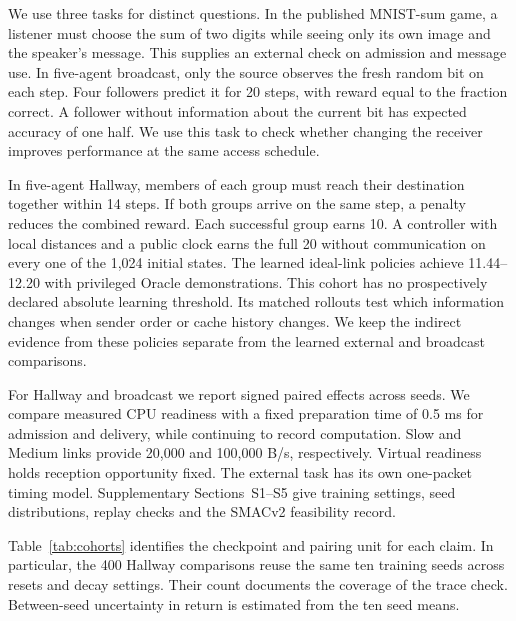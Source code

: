 \documentclass[a4paper,fleqn]{cas-dc}
\begin{document}
We use three tasks for distinct questions. In the published MNIST-sum game, a listener must choose the sum of two digits while seeing only its own image and the speaker's message. This supplies an external check on admission and message use. In five-agent broadcast, only the source observes the fresh random bit on each step. Four followers predict it for 20 steps, with reward equal to the fraction correct. A follower without information about the current bit has expected accuracy of one half. We use this task to check whether changing the receiver improves performance at the same access schedule.

In five-agent Hallway, members of each group must reach their destination together within 14 steps. If both groups arrive on the same step, a penalty reduces the combined reward. Each successful group earns 10. A controller with local distances and a public clock earns the full 20 without communication on every one of the 1,024 initial states. The learned ideal-link policies achieve 11.44--12.20 with privileged Oracle demonstrations. This cohort has no prospectively declared absolute learning threshold. Its matched rollouts test which information changes when sender order or cache history changes. We keep the indirect evidence from these policies separate from the learned external and broadcast comparisons.

For Hallway and broadcast we report signed paired effects across seeds. We compare measured CPU readiness with a fixed preparation time of 0.5 ms for admission and delivery, while continuing to record computation. Slow and Medium links provide 20,000 and 100,000 B/s, respectively. Virtual readiness holds reception opportunity fixed. The external task has its own one-packet timing model. Supplementary Sections~S1--S5 give training settings, seed distributions, replay checks and the SMACv2 feasibility record.

Table~\ref{tab:cohorts} identifies the checkpoint and pairing unit for each claim. In particular, the 400 Hallway comparisons reuse the same ten training seeds across resets and decay settings. Their count documents the coverage of the trace check. Between-seed uncertainty in return is estimated from the ten seed means.
\end{document}
